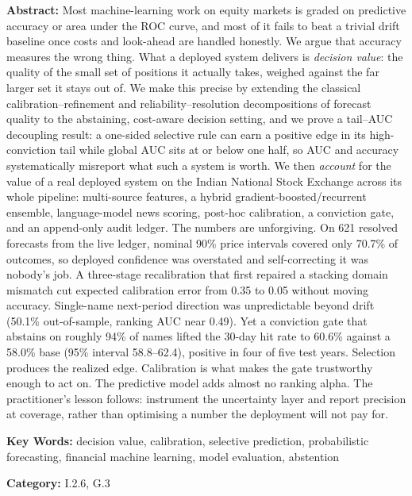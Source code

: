 \documentclass[10pt,a4paper,oneside]{article}
\theoremstyle{definition}
\theoremstyle{plain}
\begin{document}
{\fontsize{9}{11}\selectfont
\noindent\textbf{Abstract:}
Most machine-learning work on equity markets is graded on predictive accuracy or
area under the ROC curve, and most of it fails to beat a trivial drift baseline
once costs and look-ahead are handled honestly. We argue that accuracy measures
the wrong thing. What a deployed system delivers is \emph{decision value}: the
quality of the small set of positions it actually takes, weighed against the far
larger set it stays out of. We make this precise by extending the classical
calibration--refinement and reliability--resolution decompositions of forecast
quality to the abstaining, cost-aware decision setting, and we prove a
tail--AUC decoupling result: a one-sided selective rule can earn a positive edge
in its high-conviction tail while global AUC sits at or below one half, so AUC
and accuracy systematically misreport what such a system is worth. We then
\emph{account} for the value of a real deployed system on the Indian National
Stock Exchange across its whole pipeline: multi-source features, a hybrid
gradient-boosted/recurrent ensemble, language-model news scoring, post-hoc
calibration, a conviction gate, and an append-only audit ledger. The numbers are
unforgiving. On 621 resolved forecasts from the live ledger, nominal 90\% price
intervals covered only 70.7\% of outcomes, so deployed confidence was overstated
and self-correcting it was nobody's job. A three-stage recalibration that first
repaired a stacking domain mismatch cut expected calibration error from 0.35 to
0.05 without moving accuracy. Single-name next-period direction was unpredictable
beyond drift (50.1\% out-of-sample, ranking AUC near 0.49). Yet a conviction gate
that abstains on roughly 94\% of names lifted the 30-day hit rate to 60.6\%
against a 58.0\% base (95\% interval 58.8--62.4), positive in four of five test
years. Selection produces the realized edge. Calibration is what makes the gate
trustworthy enough to act on. The predictive model adds almost no ranking alpha.
The practitioner's lesson follows: instrument the uncertainty layer and report
precision at coverage, rather than optimising a number the deployment will not
pay for.

\smallskip
\noindent\textbf{Key Words:} decision value, calibration, selective prediction,
probabilistic forecasting, financial machine learning, model evaluation, abstention

\smallskip
\noindent\textbf{Category:} I.2.6, G.3
\par}
\vspace{0.4em}
\end{document}
